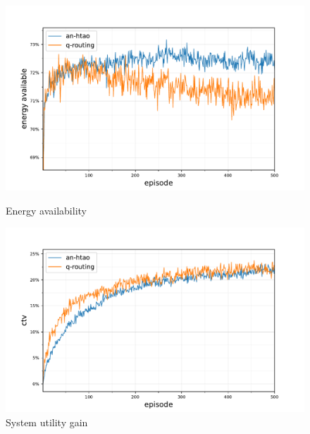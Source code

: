 \begin{figure}[ht]
	\begin{minipage}{.49\textwidth}
		\centering
		\includegraphics[width=1.0\linewidth,trim={25pt 0pt 50pt 0pt},clip]{520comparison_ctv-statistics-energy-available-comparison}
		\captionsetup{labelfont=bf,singlelinecheck=on}
		\caption{Energy availability}
		\label{fig:520comparison_ctv-statistics-energy-available-comparison}
	\end{minipage}
	\begin{minipage}{.49\textwidth}
		\centering
		\includegraphics[width=1.0\linewidth,trim={25pt 0pt 50pt 0pt},clip]{520balanced_ctv-optimal-ctv-gain}
		\captionsetup{labelfont=bf,singlelinecheck=on}
		\caption{System utility gain}
		\label{fig:520balanced_ctv-optimal-ctv-gain}
	\end{minipage}\hfill%
\end{figure}

